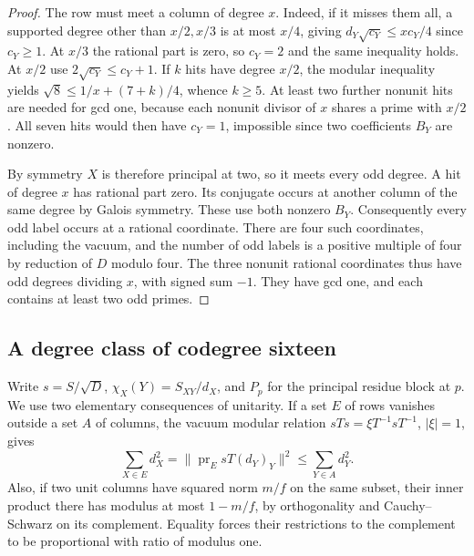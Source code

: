 \documentclass[11pt]{amsart}
\numberwithin{equation}{section}
\begin{document}
\begin{proof}
The row must meet a column of degree $x$. Indeed, if it misses them all, a supported degree other than $x/2,x/3$ is at most $x/4$, giving $d_Y\sqrt{c_Y}\le xc_Y/4$ since $c_Y\ge1$. At $x/3$ the rational part is zero, so $c_Y=2$ and the same inequality holds. At $x/2$ use $2\sqrt{c_Y}\le c_Y+1$. If $k$ hits have degree $x/2$, the modular inequality yields $\sqrt8\le1/x+(7+k)/4$, whence $k\ge5$. At least two further nonunit hits are needed for gcd one, because each nonunit divisor of $x$ shares a prime with $x/2$. All seven hits would then have $c_Y=1$, impossible since two coefficients $B_Y$ are nonzero.

By symmetry $X$ is therefore principal at two, so it meets every odd degree. A hit of degree $x$ has rational part zero. Its conjugate occurs at another column of the same degree by Galois symmetry. These use both nonzero $B_Y$. Consequently every odd label occurs at a rational coordinate. There are four such coordinates, including the vacuum, and the number of odd labels is a positive multiple of four by reduction of $D$ modulo four. The three nonunit rational coordinates thus have odd degrees dividing $x$, with signed sum $-1$. They have gcd one, and each contains at least two odd primes.
\end{proof}

\subsection{A degree class of codegree sixteen}
Write $s=S/\sqrt D$, $\chi_X(Y)=S_{XY}/d_X$, and $P_p$ for the principal residue block at $p$. We use two elementary consequences of unitarity. If a set $E$ of rows vanishes outside a set $A$ of columns, the vacuum modular relation $sTs=\xi T^{-1}sT^{-1}$, $|\xi|=1$, gives
\begin{equation}\label{sq:mass}
 \sum_{X\in E}d_X^2=\|\operatorname{pr}_E sT(d_Y)_Y\|^2
          \le\sum_{Y\in A}d_Y^2.
\end{equation}
Also, if two unit columns have squared norm $m/f$ on the same subset, their inner product there has modulus at most $1-m/f$, by orthogonality and Cauchy--Schwarz on its complement. Equality forces their restrictions to the complement to be proportional with ratio of modulus one.
\end{document}
